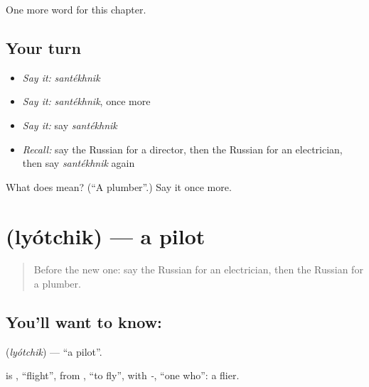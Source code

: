 \begin{grammarlens}[title={What you've built}]
One more word for this chapter.
\end{grammarlens}

\subsection*{Your turn}
\begin{itemize}
\raggedright
  \item \emph{Say it:} \emph{santékhnik}
  \item \emph{Say it:} \emph{santékhnik}, once more
  \item \emph{Say it:} say \emph{santékhnik}
  \item \emph{Recall:} say the Russian for a director, then the Russian for an electrician, then say \emph{santékhnik} again
\end{itemize}

\begin{tcolorbox}[breakable,colback=teal!4,colframe=teal!35!black,title={Before you move on}]
What does  mean? (\textquotedblleft{}A plumber\textquotedblright{}.) Say it once more.
\end{tcolorbox}
\section[\texorpdfstring{\ru{лётчик} (lyótchik)}{лётчик (lyótchik)}]{ (lyótchik) — a pilot}

\label{lesson:RU-C202-lyotchik}



\begin{quote}
Before the new one: say the Russian for an electrician, then the Russian for a plumber.
\end{quote}

\subsection*{You'll want to know: }
\textbf{} (\emph{lyótchik}) — \textquotedblleft{}a pilot\textquotedblright{}.

\begin{cousinweb}
\textbf{} is \emph{}, \textquotedblleft{}flight\textquotedblright{}, from \emph{}, \textquotedblleft{}to fly\textquotedblright{}, with \emph{-}, \textquotedblleft{}one who\textquotedblright{}: a flier.
\end{cousinweb}

